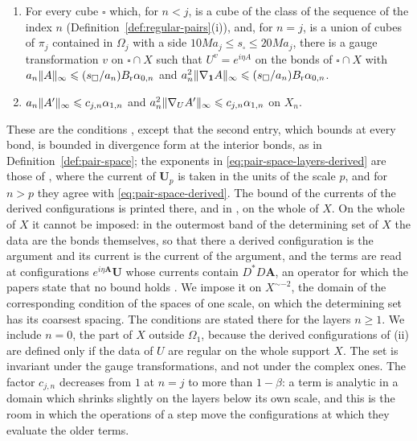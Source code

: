 \documentclass[11pt]{preprint}
\newcommand{\id}{\mathbf 1}
\DeclarePairedDelimiter{\norm}{\lVert}{\rVert}
\numberwithin{equation}{section}
\begin{document}
\begin{definition}
\begin{enumerate}[label=(\roman*)]
\item For every cube $\square$ which, for $n < j$, is a cube of the class of the sequence of the index $n$ (Definition~\ref{def:regular-pairs}(i)), and, for $n = j$, is a union of cubes of $\pi_j$ contained in $\Omega_j$ with a side $10Ma_j \leqslant s_\square \leqslant 20Ma_j$, there is a gauge transformation $v$ on $\square \cap X$ such that $U^v = e^{i\eta A}$ on the bonds of $\square \cap X$ with $a_n\norm A_\infty\leqslant (s_\square/a_n)B_{\mathrm r}\alpha_{0,n}$ and $a_n^2\norm{\nabla_{\id}A}_\infty \leqslant (s_\square/a_n)B_{\mathrm r}\alpha_{0,n}$.
\item $a_n\norm{A'}_\infty \leqslant c_{j,n}\alpha_{1,n}$ and $a_n^2\norm{\nabla_UA'}_\infty \leqslant c_{j,n}\alpha_{1,n}$ on $X_n$.
\end{enumerate}
\end{definition}

These are the conditions \cite[(2.34)--(2.39), p.~261]{BalabanCRE}, except that the second entry, which \cite[(2.36)]{BalabanCRE} bounds at every bond, is bounded in divergence form at the interior bonds, as in Definition~\ref{def:pair-space}; the exponents in \eqref{eq:pair-space-layers-derived} are those of \cite[(2.37)]{BalabanCRE}, where the current of $\mathbf U_p$ is taken in the units of the scale $p$, and for $n > p$ they agree with \eqref{eq:pair-space-derived}. The bound of the currents of the derived configurations is printed there, and in \cite[p.~190]{BalabanLFR1}, on the whole of $X$. On the whole of $X$ it cannot be imposed: in the outermost band of the determining set of $X$ the data are the bonds themselves, so that there a derived configuration is the argument and its current is the current of the argument, and the terms are read at configurations $e^{i\eta\mathbf A}\mathbf U$ whose currents contain $D^*D\mathbf A$, an operator for which the papers state that no bound holds \cite[p.~272]{BalabanRG1}. We impose it on $X^{\sim-2}$, the domain of the corresponding condition \cite[(1.16), p.~262]{BalabanRG1} of the spaces of one scale, on which the determining set has its coarsest spacing. The conditions are stated there for the layers $n \geqslant 1$. We include $n = 0$, the part of $X$ outside $\Omega_1$, because the derived configurations of (ii) are defined only if the data of $U$ are regular on the whole support $X$. The set is invariant under the gauge transformations, and not under the complex ones. The factor $c_{j,n}$ decreases from $1$ at $n = j$ to more than $1 - \beta$: a term is analytic in a domain which shrinks slightly on the layers below its own scale, and this is the room in which the operations of a step move the configurations at which they evaluate the older terms.
\end{document}
